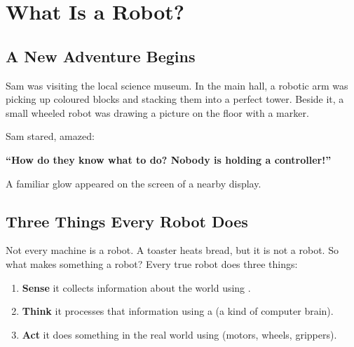 
\chapter{What Is a Robot?}


\section*{A New Adventure Begins}

Sam was visiting the local science museum. In the main hall, a
robotic arm was picking up coloured blocks and stacking them into a perfect
tower. Beside it, a small wheeled robot was drawing a picture on the floor
with a marker.

Sam stared, amazed:

\begin{center}
  \Large\bfseries\color{RoboGreen!80!black}
  ``How do they know what to do? Nobody is holding a controller!''
\end{center}

\vspace{8pt}

A familiar glow appeared on the screen of a nearby display.


\sectionrule

\section*{Three Things Every Robot Does}

Not every machine is a robot. A toaster heats bread, but it is not a robot.
So what makes something a robot? Every true robot does three things:

\begin{enumerate}
  \item \textbf{Sense} \textemdash{} it collects information about the world using .
  \item \textbf{Think} \textemdash{} it processes that information using a  (a kind of computer brain).
  \item \textbf{Act} \textemdash{} it does something in the real world using  (motors, wheels, grippers).
\end{enumerate}

